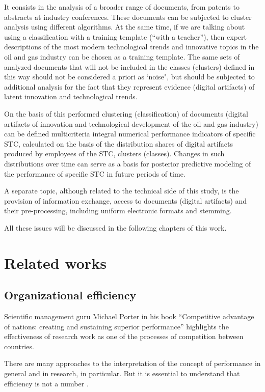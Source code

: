 \documentclass[12pt]{report}
\theoremstyle{definition}
\begin{document}
It consists in the analysis of a broader range of documents, from patents to abstracts at industry conferences.
These documents can be subjected to cluster analysis using different algorithms.
At the same time, if we are talking about using a classification with a training template (``with a teacher''), then expert descriptions of the most modern technological trends and innovative topics in the oil and gas industry can be chosen as a training template.
The same sets of analyzed documents that will not be included in the classes (clusters) defined in this way should not be considered a priori as `noise", but should be subjected to additional analysis for the fact that they represent evidence (digital artifacts) of latent innovation and technological trends.

On the basis of this performed clustering (classification) of documents (digital artifacts of innovation and technological development of the oil and gas industry) can be defined multicriteria integral numerical performance indicators of specific STC, calculated on the basis of the distribution shares of digital artifacts produced by employees of the STC, clusters (classes).
Changes in such distributions over time can serve as a basis for posterior predictive modeling of the performance of specific STC in future periods of time.

A separate topic, although related to the technical side of this study, is the provision of information exchange, access to documents (digital artifacts) and their pre-processing, including uniform electronic formats and stemming.

All these issues will be discussed in the following chapters of this work.

\chapter{Related works}
\section{Organizational efficiency}

Scientific management guru Michael Porter in his book ``Competitive advantage of nations: creating and sustaining superior performance'' \autocite{porter2011competitive} highlights the effectiveness of research work as one of the processes of competition between countries. 

There are many approaches to the interpretation of the concept of performance in general and in research, in particular. 
But it is essential to understand that efficiency is not a number \autocite{quinn1983spatial, wolfe1994organizational, daft2010organization}.
\end{document}
